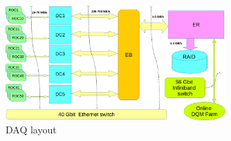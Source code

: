 \begin{figure}[tbp]
\begin{center}
\includegraphics[width=0.75\textwidth]{figures/DAQ_coda.pdf}  
\caption{ \label{fig:CODA}
DAQ layout}

\end{center}
\end{figure}
